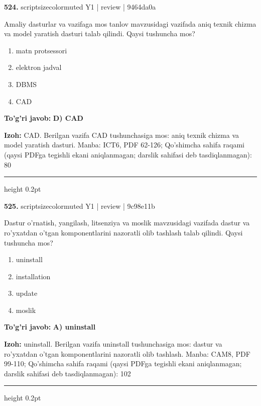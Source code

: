 \documentclass[10pt,a4paper]{article}
\begin{document}
{\bfseries\sffamily\color{ink} 524.} {scriptsizecolor{muted} Y1 | review | 9464da0a}
\par
Amaliy dasturlar va vazifaga mos tanlov mavzusidagi vazifada aniq texnik chizma va model yaratish dasturi talab qilindi. Qaysi tushuncha mos?
\begin{enumerate}[label=\Alph*),leftmargin=9mm]
\item matn protsessori
\item elektron jadval
\item DBMS
\item CAD
\end{enumerate}
\begin{tcolorbox}[enhanced,breakable,colback=teal!4,colframe=teal!60!black,boxrule=0.45pt,arc=1.2mm,left=2.7mm,right=2.7mm,top=1.8mm,bottom=1.8mm,before skip=2mm,after skip=2mm]
{\bfseries\sffamily\color{teal}To'g'ri javob:} \textbf{D) CAD}
\par\smallskip
{\bfseries Izoh:} CAD. Berilgan vazifa CAD tushunchasiga mos: aniq texnik chizma va model yaratish dasturi. Manba: ICT6, PDF 62-126; Qo'shimcha sahifa raqami (qaysi PDFga tegishli ekani aniqlanmagan; darslik sahifasi deb tasdiqlanmagan): 80
\end{tcolorbox}
\vspace{2mm}\hrule height 0.2pt\vspace{3mm}

{\bfseries\sffamily\color{ink} 525.} {scriptsizecolor{muted} Y1 | review | 9c98e11b}
\par
Dastur o'rnatish, yangilash, litsenziya va moslik mavzusidagi vazifada dastur va ro'yxatdan o'tgan komponentlarini nazoratli olib tashlash talab qilindi. Qaysi tushuncha mos?
\begin{enumerate}[label=\Alph*),leftmargin=9mm]
\item uninstall
\item installation
\item update
\item moslik
\end{enumerate}
\begin{tcolorbox}[enhanced,breakable,colback=teal!4,colframe=teal!60!black,boxrule=0.45pt,arc=1.2mm,left=2.7mm,right=2.7mm,top=1.8mm,bottom=1.8mm,before skip=2mm,after skip=2mm]
{\bfseries\sffamily\color{teal}To'g'ri javob:} \textbf{A) uninstall}
\par\smallskip
{\bfseries Izoh:} uninstall. Berilgan vazifa uninstall tushunchasiga mos: dastur va ro'yxatdan o'tgan komponentlarini nazoratli olib tashlash. Manba: CAM8, PDF 99-110; Qo'shimcha sahifa raqami (qaysi PDFga tegishli ekani aniqlanmagan; darslik sahifasi deb tasdiqlanmagan): 102
\end{tcolorbox}
\vspace{2mm}\hrule height 0.2pt\vspace{3mm}
\end{document}
